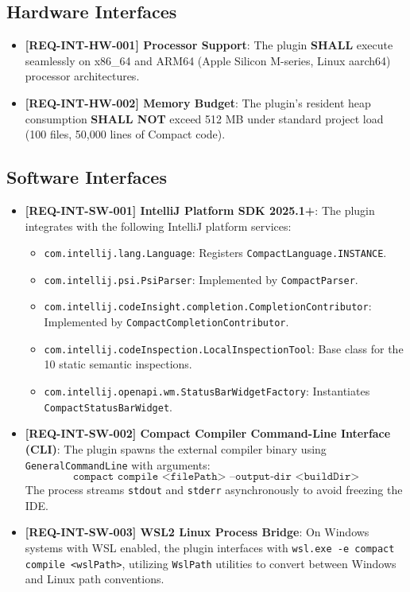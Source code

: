 \subsection{Hardware Interfaces}
\begin{itemize}
    \item \textbf{[REQ-INT-HW-001] Processor Support}: The plugin \textbf{SHALL} execute seamlessly on x86\_64 and ARM64 (Apple Silicon M-series, Linux aarch64) processor architectures.
    \item \textbf{[REQ-INT-HW-002] Memory Budget}: The plugin's resident heap consumption \textbf{SHALL NOT} exceed 512 MB under standard project load (100 files, 50,000 lines of Compact code).
\end{itemize}

\subsection{Software Interfaces}
\begin{itemize}
    \item \textbf{[REQ-INT-SW-001] IntelliJ Platform SDK 2025.1+}:
    The plugin integrates with the following IntelliJ platform services:
    \begin{itemize}
        \item \texttt{com.intellij.lang.Language}: Registers \texttt{CompactLanguage.INSTANCE}.
        \item \texttt{com.intellij.psi.PsiParser}: Implemented by \texttt{CompactParser}.
        \item \texttt{com.intellij.codeInsight.completion.CompletionContributor}: Implemented by \texttt{CompactCompletionContributor}.
        \item \texttt{com.intellij.codeInspection.LocalInspectionTool}: Base class for the 10 static semantic inspections.
        \item \texttt{com.intellij.openapi.wm.StatusBarWidgetFactory}: Instantiates \texttt{CompactStatusBarWidget}.
    \end{itemize}
    
    \item \textbf{[REQ-INT-SW-002] Compact Compiler Command-Line Interface (CLI)}:
    The plugin spawns the external compiler binary using \texttt{GeneralCommandLine} with arguments:
    \begin{equation*}
        \texttt{compact compile <filePath> --output-dir <buildDir>}
    \end{equation*}
    The process streams \texttt{stdout} and \texttt{stderr} asynchronously to avoid freezing the IDE.
    
    \item \textbf{[REQ-INT-SW-003] WSL2 Linux Process Bridge}:
    On Windows systems with WSL enabled, the plugin interfaces with \texttt{wsl.exe -e compact compile <wslPath>}, utilizing \texttt{WslPath} utilities to convert between Windows and Linux path conventions.
\end{itemize}

